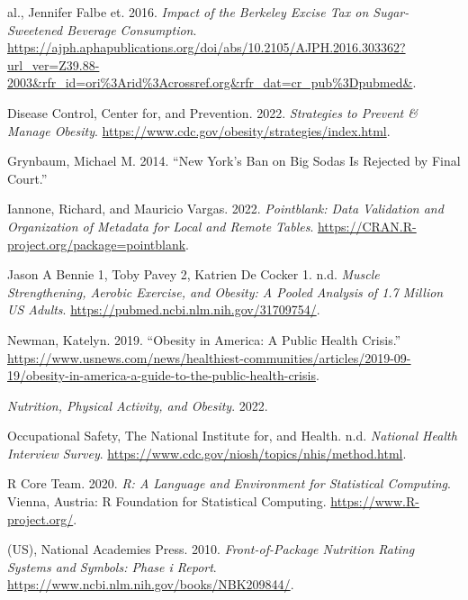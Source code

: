 \documentclass[
]{article}
\newlength{\cslhangindent}
\newlength{\cslentryspacingunit} %
\newenvironment{CSLReferences}[2] %
 {%
  \setlength{\parindent}{0pt}
  \ifodd #1
  \let\oldpar\par
  \def\par{\hangindent=\cslhangindent\oldpar}
  \fi
  \setlength{\parskip}{#2\cslentryspacingunit}
 }%
 {}
\begin{document}
\hypertarget{refs}{}
\begin{CSLReferences}{1}{0}
\leavevmode{}%
al., Jennifer Falbe et. 2016. \emph{Impact of the Berkeley Excise Tax on Sugar-Sweetened Beverage Consumption}. \url{https://ajph.aphapublications.org/doi/abs/10.2105/AJPH.2016.303362?url_ver=Z39.88-2003\&rfr_id=ori\%3Arid\%3Acrossref.org\&rfr_dat=cr_pub\%3Dpubmed\&}.

\leavevmode{}%
Disease Control, Center for, and Prevention. 2022. \emph{Strategies to Prevent \& Manage Obesity}. \url{https://www.cdc.gov/obesity/strategies/index.html}.

\leavevmode{}%
Grynbaum, Michael M. 2014. {``New York's Ban on Big Sodas Is Rejected by Final Court.''}

\leavevmode{}%
Iannone, Richard, and Mauricio Vargas. 2022. \emph{Pointblank: Data Validation and Organization of Metadata for Local and Remote Tables}. \url{https://CRAN.R-project.org/package=pointblank}.

\leavevmode{}%
Jason A Bennie 1, Toby Pavey 2, Katrien De Cocker 1. n.d. \emph{Muscle Strengthening, Aerobic Exercise, and Obesity: A Pooled Analysis of 1.7 Million US Adults}. \url{https://pubmed.ncbi.nlm.nih.gov/31709754/}.

\leavevmode{}%
Newman, Katelyn. 2019. {``Obesity in America: A Public Health Crisis.''} \url{https://www.usnews.com/news/healthiest-communities/articles/2019-09-19/obesity-in-america-a-guide-to-the-public-health-crisis}.

\leavevmode{}%
\emph{Nutrition, Physical Activity, and Obesity}. 2022.

\leavevmode{}%
Occupational Safety, The National Institute for, and Health. n.d. \emph{National Health Interview Survey}. \url{https://www.cdc.gov/niosh/topics/nhis/method.html}.

\leavevmode{}%
R Core Team. 2020. \emph{R: A Language and Environment for Statistical Computing}. Vienna, Austria: R Foundation for Statistical Computing. \url{https://www.R-project.org/}.

\leavevmode{}%
(US), National Academies Press. 2010. \emph{Front-of-Package Nutrition Rating Systems and Symbols: Phase i Report}. \url{https://www.ncbi.nlm.nih.gov/books/NBK209844/}.


\end{CSLReferences}
\end{document}

